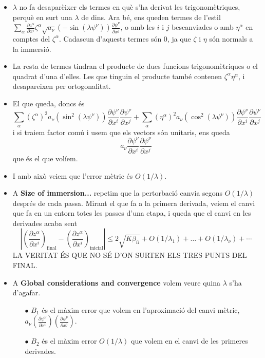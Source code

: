 {\begin{itemize}
    \item $\lambda$ no fa desaparèixer els termes en què s'ha derivat les trigonomètriques, perquè en surt una $\lambda$ de dins. Ara bé, ens queden termes de l'estil $\sum_\alpha\frac{\partial z^\alpha}{\partial x^i}\zeta^\alpha\sqrt{a_\nu}(-\sin(\lambda \psi^\nu))\frac{\partial\psi^\nu}{\partial x^j}$, o amb les $i$ i $j$ bescanviades o amb $\eta^\alpha$ en comptes del $\zeta^\alpha$. Cadascun d'aquests termes són $0$, ja que $\zeta$ i $\eta$ són normals a la immersió.
    \item La resta de termes tindran el producte de dues funcions trigonomètriques o el quadrat d'una d'elles. Les que tinguin el producte també contenen $\zeta^\alpha\eta^\alpha$, i desapareixen per ortogonalitat.
    \item El que queda, doncs és 
    $$\sum_\alpha (\zeta^\alpha)^2 a_\nu (\sin^2(\lambda \psi^\nu) ) \frac{\partial\psi^\nu}{\partial x^i}\frac{\partial\psi^\nu}{\partial x^j} + \sum_\alpha (\eta^\alpha)^2 a_\nu (\cos^2(\lambda \psi^\nu) ) \frac{\partial\psi^\nu}{\partial x^i}\frac{\partial\psi^\nu}{\partial x^j}$$
    i si traiem factor comú i usem que els vectors són unitaris, ens queda
    $$a_\nu\frac{\partial\psi^\nu}{\partial x^i}\frac{\partial\psi^\nu}{\partial x^j}$$
    que és el que volíem.
    \item I amb això veiem que l'error mètric és $O(1/\lambda)$.
    \item A \textbf{Size of immersion...} repetim que la pertorbació canvia segons $O(1/\lambda)$ després de cada passa. Mirant el que fa a la primera derivada, veiem el canvi que fa en un entorn totes les passes d'una etapa, i queda que el canvi en les derivades acaba sent $$\left|\left( \frac{\partial z^\alpha}{\partial x^i}\right)_{\text{final}}-\left( \frac{\partial z^\alpha}{\partial x^i}\right)_{\text{inicial}}\right| \le 2\sqrt{K\beta_{ii}}+O(1/\lambda_1)+\dots + O(1/\lambda_\nu)+\cdots$$ LA VERITAT ÉS QUE NO SÉ D'ON SURTEN ELS TRES PUNTS DEL FINAL.
    \item A \textbf{Global considerations and convergence} volem veure quina $\lambda$ s'ha d'agafar. 
    \begin{itemize}
        \item[$\bullet$] $B_1$ és el màxim error que volem en l'aproximació del canvi mètric, \\$a_\nu\left(\frac{\partial\psi^\nu}{\partial x^i}\right)\left(\frac{\partial\psi^\nu}{\partial x^j}\right)$.
        \item[$\bullet$] $B_2$ és el màxim error $O(1/\lambda)$ que volem en el canvi de les primeres derivades.

\end{itemize}
\end{itemize}}
